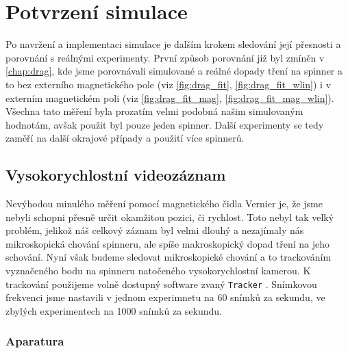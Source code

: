 \chapter{Potvrzení simulace}
\label{chap:sim_confirmation}

Po navržení a implementaci simulace je dalším krokem sledování její přesnosti a porovnání s reálnými experimenty. První způsob porovnání již byl zmíněn v \autoref{chap:drag}, kde jsme porovnávali simulované a reálné dopady tření na spinner a to bez externího magnetického pole (viz \autoref{fig:drag_fit}, \autoref{fig:drag_fit_wlin}) i v externím magnetickém poli (viz \autoref{fig:drag_fit_mag}, \autoref{fig:drag_fit_mag_wlin}). Všechna tato měření byla prozatím velmi podobná našim simulovaným hodnotám, avšak použit byl pouze jeden spinner. Další experimenty se tedy zaměří na další okrajové případy a použití více spinnerů.

\section{Vysokorychlostní videozáznam}

Nevýhodou minulého měření pomocí magnetického čidla Vernier je, že jsme nebyli schopni přesně určit okamžitou pozici, či rychlost. Toto nebyl tak velký problém, jelikož náš celkový záznam byl velmi dlouhý a nezajímaly nás mikroskopická chování spinneru, ale spíše makroskopický dopad tření na jeho schování. Nyní však budeme sledovat mikroskopické chování a to trackováním vyznačeného bodu na spinneru natočeného vysokorychlostní kamerou. K trackování použijeme volně dostupný software zvaný \texttt{Tracker} \cite{Tracker}. Snímkovou frekvenci jsme nastavili v jednom experimnetu na 60 snímků za sekundu, ve zbylých experimentech na 1000 snímků za sekundu.

\subsection{Aparatura}